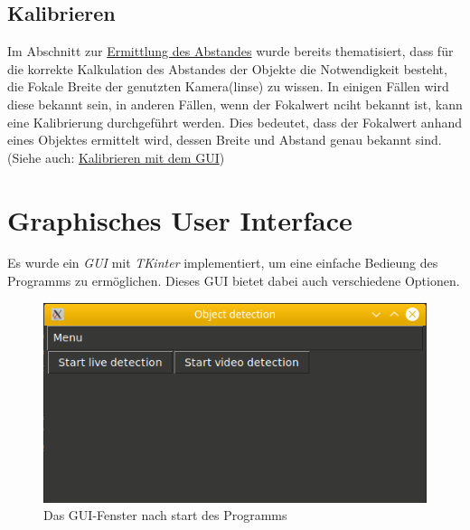 \documentclass[12pt]{article}
\theoremstyle{definition}
\begin{document}
\subsection{Kalibrieren}
\begin{flushleft}
Im Abschnitt zur \hyperlink{abst_erm}{Ermittlung des Abstandes} wurde bereits thematisiert, dass für die korrekte Kalkulation des Abstandes der Objekte die Notwendigkeit besteht, die Fokale Breite der genutzten Kamera(linse) zu wissen. In einigen Fällen wird diese bekannt sein, in anderen Fällen, wenn der Fokalwert nciht bekannt ist, kann eine Kalibrierung durchgeführt werden. Dies bedeutet, dass der Fokalwert anhand eines Objektes ermittelt wird, dessen Breite und Abstand genau bekannt sind. (Siehe auch: \hyperlink{calib_gui}{Kalibrieren mit dem GUI})


\end{flushleft}

\newpage

\section{Graphisches User Interface}
\begin{flushleft}
\hypertarget{t_gui}{}Es wurde ein \textit{GUI} mit \textit{TKinter} implementiert, um eine einfache Bedieung des Programms zu ermöglichen. Dieses GUI bietet dabei auch verschiedene Optionen.
\end{flushleft}

\begin{figure}[h]
\centering
\includegraphics[scale=0.7]{gui_home}
\caption{Das GUI-Fenster nach start des Programms}
\label{fig:gui_home}
\end{figure}
\end{document}
